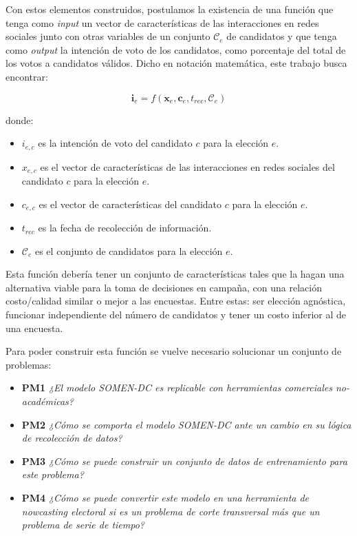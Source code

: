 Con estos elementos construidos, postulamos la existencia de una función que tenga como \textit{input} un vector de características de las interacciones en redes sociales junto con otras variables de un conjunto $\mathcal{C}_{e}$ de candidatos y que tenga como \textit{output} la intención de voto de los candidatos, como porcentaje del total de los votos a candidatos válidos. Dicho en notación matemática, este trabajo busca encontrar:

\begin{equation}
    \mathbf{i}_{e} = f(\mathbf{x}_{e}, \mathbf{c}_{e}, t_{rec}, \mathcal{C}_{e})
    \label{eq:funcion-intencion-voto}
\end{equation}

donde:

\begin{itemize}
    \item $i_{e,c}$ es la intención de voto del candidato $c$ para la elección $e$.
    \item $x_{e,c}$ es el vector de características de las interacciones en redes sociales del candidato $c$ para la elección $e$.
    \item $c_{e,c}$ es el vector de características del candidato $c$ para la elección $e$.
    \item $t_{rec}$ es la fecha de recolección de información.
    \item $\mathcal{C}_{e}$ es el conjunto de candidatos para la elección $e$.
\end{itemize}

Esta función debería tener un conjunto de características tales que la hagan una alternativa viable para la toma de decisiones en campaña, con una relación costo/calidad similar o mejor a las encuestas. Entre estas: ser elección agnóstica, funcionar independiente del número de candidatos y tener un costo inferior al de una encuesta.

Para poder construir esta función se vuelve necesario solucionar un conjunto de problemas:

\begin{itemize}
\item \textbf{PM1} \textit{¿El modelo SOMEN-DC es replicable con herramientas comerciales no-académicas?} 
\item \textbf{PM2} \textit{¿Cómo se comporta el modelo SOMEN-DC ante un cambio en su lógica de recolección de datos?} 
\item \textbf{PM3} \textit{¿Cómo se puede construir un conjunto de datos de entrenamiento para este problema?} 
\item \textbf{PM4} \textit{¿Cómo se puede convertir este modelo en una herramienta de \textit{nowcasting} electoral si es un problema de corte transversal más que un problema de serie de tiempo?} 
\end{itemize}

